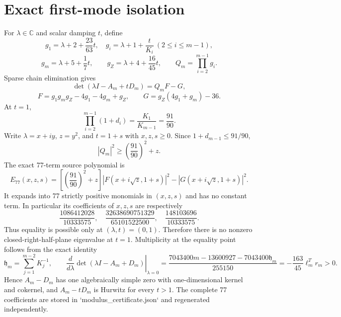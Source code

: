 \section*{Exact first-mode isolation}
For $\lambda\in\mathbb C$ and scalar damping $t$, define
\[
g_1=\lambda+2+\frac{23}{63}t,
\quad
g_i=\lambda+1+\frac{t}{K_i}\ (2\le i\le m-1),
\]
\[
g_m=\lambda+5+\frac17t,
\qquad
g_Z=\lambda+4+\frac{16}{45}t,
\qquad
Q_m=\prod_{i=2}^{m-1}g_i.
\]
Sparse chain elimination gives
\[
\det(\lambda I-A_m+tD_m)=Q_mF-G,
\]
\[
F=g_1g_mg_Z-4g_1-4g_m+g_Z,
\qquad
G=g_Z(4g_1+g_m)-36.
\]
At $t=1$,
\[
\prod_{i=2}^{m-1}(1+d_i)=\frac{K_1}{K_{m-1}}=\frac{91}{90}.
\]
Write $\lambda=x+iy$, $z=y^2$, and $t=1+s$ with $x,z,s\ge0$.  Since
$1+d_{m-1}\le91/90$,
\[
|Q_m|^2\ge\left(\frac{91}{90}\right)^2+z.
\]
The exact 77-term source polynomial is
\[
E_{77}(x,z,s)=
\left[\left(\frac{91}{90}\right)^2+z\right]
|F(x+i\sqrt z,1+s)|^2-|G(x+i\sqrt z,1+s)|^2.
\]
It expands into 77 strictly positive monomials in $(x,z,s)$ and has no constant
term.  In particular its coefficients of $x,z,s$ are respectively
\[
\frac{1086412028}{10333575},
\quad
\frac{32638690751329}{65101522500},
\quad
\frac{148103696}{10333575}.
\]
Thus equality is possible only at $(\lambda,t)=(0,1)$.  Therefore
there is no nonzero closed-right-half-plane eigenvalue at $t=1$.  Multiplicity
at the equality point follows from the exact identity
\[
 \mathfrak h_m=\sum_{j=1}^{m-2}K_j^{-1},\qquad
 \left.\frac{d}{d\lambda}\det(\lambda I-A_m+D_m)\right|_{\lambda=0}
 =\frac{7043400m-13600927-7043400\mathfrak h_m}{255150}
 =-\frac{163}{45}\ell_m^Tr_m>0.
\]
Hence $A_m-D_m$ has one algebraically simple zero with one-dimensional kernel
and cokernel, and $A_m-tD_m$ is Hurwitz for every $t>1$.  The complete 77 coefficients are
stored in `modulus_certificate.json` and regenerated independently.

